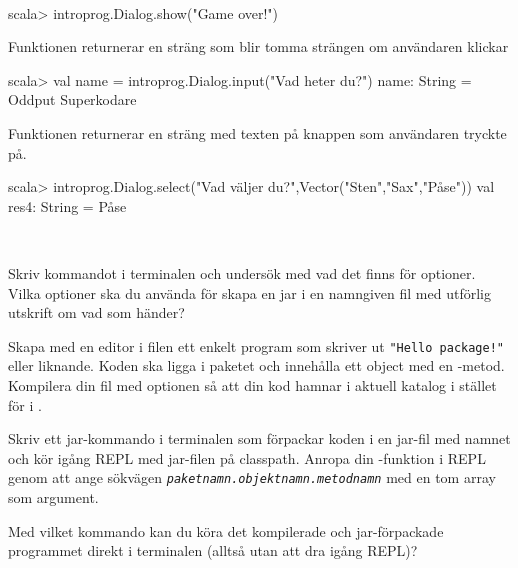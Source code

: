 \SOLUTION

\TaskSolved \what~

\SubtaskSolved
\begin{REPL}
scala> introprog.Dialog.show("Game over!")
\end{REPL}

\SubtaskSolved Funktionen  returnerar en sträng som blir tomma strängen  om användaren klickar 
\begin{REPL}
scala> val name = introprog.Dialog.input("Vad heter du?")
name: String = Oddput Superkodare
\end{REPL}

\SubtaskSolved Funktionen  returnerar en sträng med texten på knappen som användaren tryckte på.
\begin{REPL}
scala> introprog.Dialog.select("Vad väljer du?",Vector("Sten","Sax","Påse"))
val res4: String = Påse
\end{REPL}

\QUESTEND





\QUESTBEGIN

\Task\Uberkurs  \what~

\Subtask Skriv kommandot  i terminalen och undersök med  vad det finns för optioner. Vilka optioner ska du använda för skapa  en jar i en namngiven fil  med utförlig  utskrift om vad som händer? 

\Subtask Skapa med en editor i filen  ett enkelt program som skriver ut \texttt{"Hello package!"} eller liknande. Koden ska ligga i paketet  och innehålla ett object  med en -metod. Kompilera din fil med optionen  så att din kod hamnar i aktuell katalog i stället för i .

\Subtask Skriv ett jar-kommando i terminalen som förpackar koden i en jar-fil med namnet  och kör igång REPL med jar-filen på classpath. Anropa din -funktion i REPL genom att ange sökvägen \textit{\texttt{paketnamn.objektnamn.metodnamn}} med en tom array som argument.

\Subtask Med vilket kommando kan du köra det kompilerade och jar-förpackade programmet direkt i terminalen (alltså utan att dra igång REPL)?

\SOLUTION

